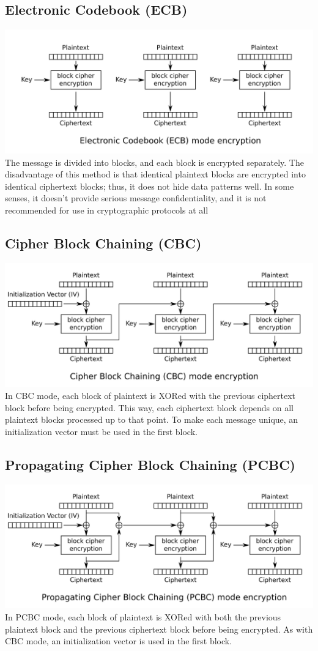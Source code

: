 \documentclass[10pt,a4paper]{article}
\begin{document}
\subsection{Electronic Codebook (ECB)}
\includegraphics[scale=0.2]{img/ECB.png}
\newline
The message is divided into blocks, and each block is encrypted separately. The disadvantage of this method is that identical plaintext blocks are encrypted into identical ciphertext blocks; thus, it does not hide data patterns well. In some senses, it doesn't provide serious message confidentiality, and it is not recommended for use in cryptographic protocols at all
\subsection{Cipher Block Chaining (CBC)}
\includegraphics[scale=0.2]{img/CBC.png}
\newline
 In CBC mode, each block of plaintext is XORed with the previous ciphertext block before being encrypted. This way, each ciphertext block depends on all plaintext blocks processed up to that point. To make each message unique, an initialization vector must be used in the first block.
\subsection{Propagating Cipher Block Chaining (PCBC)}
\includegraphics[scale=0.2]{img/PCBC.png}
\newline 
In PCBC mode, each block of plaintext is XORed with both the previous plaintext block and the previous ciphertext block before being encrypted. As with CBC mode, an initialization vector is used in the first block.
\end{document}
